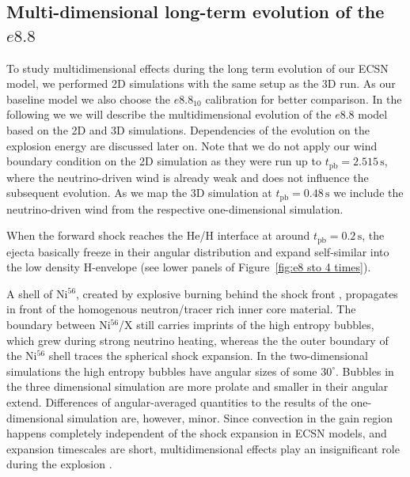 \documentclass[fleqn,usenatbib]{mnras}
\newcommand{\tpb}{\ensuremath{t_{\text{pb}}}}
\newcommand{\nickel}{$\mathrm{Ni^{56}}$\xspace}
\newcommand{\tracer}{$\mathrm{X}$\xspace}
\renewcommand{\sec}{\xspace\ensuremath{\text{s}}}
\begin{document}
\subsection{Multi-dimensional long-term evolution of the $e8.8$}
\label{sec:Multi-dimensional long-term evolution of the e8.8}
To study multidimensional effects during the long term evolution of our ECSN model, we performed 2D simulations with the same setup as the 3D run. As our baseline model we also choose the $e8.8_{10}$ calibration for better comparison.
In the following we we will describe the multidimensional evolution of the $e8.8$ model based on the 2D and 3D simulations. Dependencies of the evolution on the explosion energy are discussed later on.
Note that we do not apply our wind boundary condition on the 2D simulation as they were run up to $\tpb=2.515\,\sec$, where the neutrino-driven wind is already weak and does not influence the subsequent evolution. As we map the 3D simulation at $\tpb=0.48\,\sec$ we include the neutrino-driven wind from the respective one-dimensional simulation.

When the forward shock reaches the He/H interface at around $\tpb=0.2\,\sec$, the ejecta basically freeze in their angular distribution and expand self-similar into the low density H-envelope (see lower panels of Figure~\ref{fig:e8 sto 4 times}). 

A shell of \nickel, created by explosive burning behind the shock front \citep{Kifonidis2006}, propagates in front of the homogenous neutron/tracer rich inner core material. The boundary between \nickel/\tracer still carries imprints of the high entropy bubbles, which grew during strong neutrino heating, whereas the the outer boundary of the \nickel shell traces the spherical shock expansion. In the two-dimensional simulations the high entropy bubbles have angular sizes of some $30^{\circ}$. Bubbles in the three dimensional simulation are more prolate and smaller in their angular extend. 
Differences of angular-averaged quantities to the results of the one-dimensional simulation are, however, minor. Since convection in the gain region happens completely independent of the shock expansion in ECSN models, and expansion timescales are short, multidimensional effects play an insignificant role during the explosion \citep{Janka2008}. 
\end{document}
